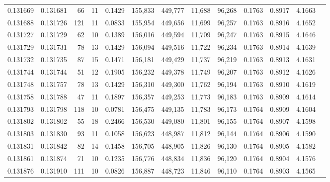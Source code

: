 \begin{tabular}{rrrrrrrrrrrrr}
0.131669 & 0.131681 &    66 &  11 &                                     0.1429 & 155,833 & 449,777 &  11,688 &  96,268 & 0.1763 & 0.8917 & 4.1663 \\
0.131688 & 0.131726 &   121 &  11 &                                     0.0833 & 155,954 & 449,656 &  11,699 &  96,257 & 0.1763 & 0.8916 & 4.1652 \\
0.131727 & 0.131729 &    62 &  10 &                                     0.1389 & 156,016 & 449,594 &  11,709 &  96,247 & 0.1763 & 0.8915 & 4.1646 \\
0.131729 & 0.131731 &    78 &  13 &                                     0.1429 & 156,094 & 449,516 &  11,722 &  96,234 & 0.1763 & 0.8914 & 4.1639 \\
0.131732 & 0.131735 &    87 &  15 &                                     0.1471 & 156,181 & 449,429 &  11,737 &  96,219 & 0.1763 & 0.8913 & 4.1631 \\
0.131744 & 0.131744 &    51 &  12 &                                     0.1905 & 156,232 & 449,378 &  11,749 &  96,207 & 0.1763 & 0.8912 & 4.1626 \\
0.131748 & 0.131757 &    78 &  13 &                                     0.1429 & 156,310 & 449,300 &  11,762 &  96,194 & 0.1763 & 0.8910 & 4.1619 \\
0.131758 & 0.131788 &    47 &  11 &                                     0.1897 & 156,357 & 449,253 &  11,773 &  96,183 & 0.1763 & 0.8909 & 4.1614 \\
0.131793 & 0.131798 &   118 &  10 &                                     0.0781 & 156,475 & 449,135 &  11,783 &  96,173 & 0.1764 & 0.8909 & 4.1604 \\
0.131802 & 0.131802 &    55 &  18 &                                     0.2466 & 156,530 & 449,080 &  11,801 &  96,155 & 0.1764 & 0.8907 & 4.1598 \\
0.131803 & 0.131830 &    93 &  11 &                                     0.1058 & 156,623 & 448,987 &  11,812 &  96,144 & 0.1764 & 0.8906 & 4.1590 \\
0.131831 & 0.131842 &    82 &  14 &                                     0.1458 & 156,705 & 448,905 &  11,826 &  96,130 & 0.1764 & 0.8905 & 4.1582 \\
0.131861 & 0.131874 &    71 &  10 &                                     0.1235 & 156,776 & 448,834 &  11,836 &  96,120 & 0.1764 & 0.8904 & 4.1576 \\
0.131876 & 0.131910 &   111 &  10 &                                     0.0826 & 156,887 & 448,723 &  11,846 &  96,110 & 0.1764 & 0.8903 & 4.1565 \\

\end{tabular}
